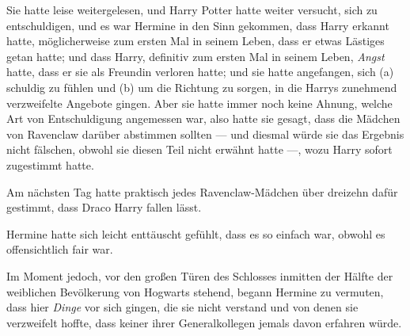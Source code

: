 Sie hatte leise weitergelesen, und Harry Potter hatte weiter versucht, sich zu entschuldigen, und es war Hermine in den Sinn gekommen, dass Harry erkannt hatte, möglicherweise zum ersten Mal in seinem Leben, dass er etwas Lästiges getan hatte; und dass Harry, definitiv zum ersten Mal in seinem Leben, \emph{Angst} hatte, dass er sie als Freundin verloren hatte; und sie hatte angefangen, sich (a) schuldig zu fühlen und (b) um die Richtung zu sorgen, in die Harrys zunehmend verzweifelte Angebote gingen. Aber sie hatte immer noch keine Ahnung, welche Art von Entschuldigung angemessen war, also hatte sie gesagt, dass die Mädchen von Ravenclaw darüber abstimmen sollten — und diesmal würde sie das Ergebnis nicht fälschen, obwohl sie diesen Teil nicht erwähnt hatte —, wozu Harry sofort zugestimmt hatte.

Am nächsten Tag hatte praktisch jedes Ravenclaw-Mädchen über dreizehn dafür gestimmt, dass Draco Harry fallen lässt.

Hermine hatte sich leicht enttäuscht gefühlt, dass es so einfach war, obwohl es offensichtlich fair war.

Im Moment jedoch, vor den großen Türen des Schlosses inmitten der Hälfte der weiblichen Bevölkerung von Hogwarts stehend, begann Hermine zu vermuten, dass hier \emph{Dinge} vor sich gingen, die sie nicht verstand und von denen sie verzweifelt hoffte, dass keiner ihrer Generalkollegen jemals davon erfahren würde.

